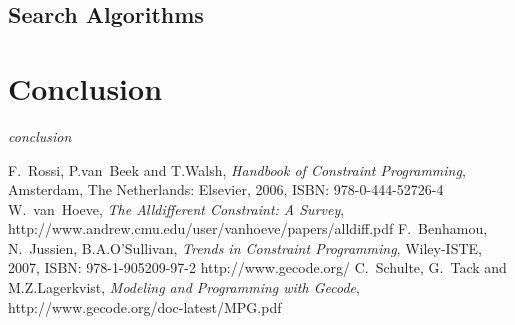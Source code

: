 \documentclass[10pt,
               a4paper,
               journal,
               ]{IEEEtran}
\begin{document}
	\subsection{Search Algorithms}
	
	\section{Conclusion}
	\textit{conclusion}
	
	\begin{thebibliography}{1}
		F.~Rossi, P.van~Beek and T.Walsh, \emph{Handbook of Constraint Programming}, Amsterdam, The Netherlands: Elsevier, 2006, ISBN: 978-0-444-52726-4
		W.~van~Hoeve, \emph{The Alldifferent Constraint: A Survey}, http://www.andrew.cmu.edu/user/vanhoeve/papers/alldiff.pdf
		F.~Benhamou, N.~Jussien, B.A.O'Sullivan, \emph{Trends in Constraint Programming}, Wiley-ISTE, 2007, ISBN: 978-1-905209-97-2
		http://www.gecode.org/
		C.~Schulte, G.~Tack and M.Z.Lagerkvist, \emph{Modeling and Programming with Gecode}, http://www.gecode.org/doc-latest/MPG.pdf
	\end{thebibliography}
\end{document}
